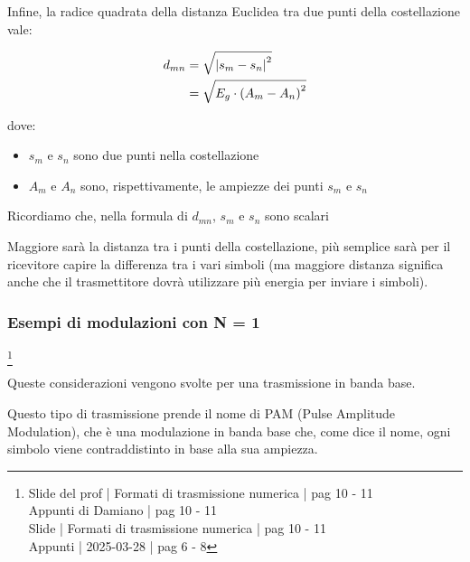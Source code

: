 Infine, la radice quadrata della distanza Euclidea tra due punti della costellazione vale: 

{
    \Large 
    \begin{equation}
        \begin{split}
            d_{mn}
            &= 
            \sqrt{\abs{s_m - s_n}^{2}}
            \\
            &= 
            \sqrt{E_g \cdot \left(A_m - A_n\right)^{2}}
        \end{split}
    \end{equation}
}

dove: 

\begin{itemize}
    \item $s_m$ e $s_n$ sono due punti nella costellazione 
    \item $A_m$ e $A_n$ sono, rispettivamente, le ampiezze dei punti $s_m$ e $s_n$ 
\end{itemize}

\begin{tcolorbox}
    Ricordiamo che, nella formula di $d_{mn}$, $s_m$ e $s_n$ sono scalari
\end{tcolorbox}

Maggiore sarà la distanza tra i punti della costellazione, 
più semplice sarà per il ricevitore capire la differenza tra i vari simboli 
(ma maggiore distanza significa anche che il trasmettitore dovrà utilizzare più energia per inviare i simboli). \newline 

\newpage 

\subsubsection{Esempi di modulazioni con N = 1}
\footnote{Slide del prof | Formati di trasmissione numerica | pag 10 - 11\\  
Appunti di Damiano | pag 10 - 11\\
Slide | Formati di trasmissione numerica | pag  10 - 11\\
Appunti | 2025-03-28 | pag 6 - 8
}

Queste considerazioni vengono svolte per una trasmissione in banda base. \newline 

Questo tipo di trasmissione prende il nome di PAM (Pulse Amplitude Modulation), 
che è una modulazione in banda base che, come dice il nome, ogni simbolo viene contraddistinto in base alla sua ampiezza. \newline 

